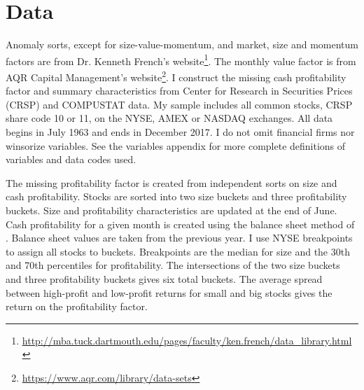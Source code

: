 
\section*{Data}

Anomaly sorts, except for size-value-momentum, and market, size and
momentum factors are from Dr. Kenneth French's website\footnote{
\url{http://mba.tuck.dartmouth.edu/pages/faculty/ken.french/data_library.html}
}. The monthly value factor is from AQR Capital Management's website\footnote{
\url{https://www.aqr.com/library/data-sets}
}.
I construct the missing cash profitability factor and summary characteristics
from Center for Research in Securities Prices (CRSP) and COMPUSTAT data. My
sample includes all common stocks, CRSP share code 10 or 11, on the NYSE, AMEX
or NASDAQ exchanges. All data begins in July 1963 and ends in December 2017. I
do not omit financial firms nor winsorize variables. See the variables appendix
for more complete definitions of variables and data codes used.

The missing profitability factor is created from independent sorts on size and
cash profitability.
Stocks are sorted into two size buckets and three profitability buckets.
Size and profitability characteristics are updated at the end of June.
Cash profitability for a given month is created using the balance sheet method
of \textcite{ball2016accruals}.
Balance sheet values are taken from the previous year. 
I use NYSE breakpoints to assign all stocks to buckets.
Breakpoints are the median for size and the 30th and 70th percentiles for
profitability.
The intersections of the two size buckets and three profitability buckets
gives six total buckets.
The average spread between high-profit and low-profit returns for small
and big stocks gives the return on the profitability factor.

